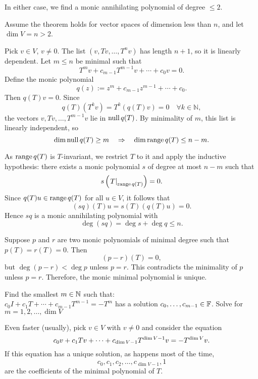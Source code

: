 \begin{prf}
  In either case, we find a monic annihilating polynomial of degree $\leq 2$.

   Assume the theorem holds for vector spaces of dimension less than $n$, and let $\dim V = n > 2$.

  Pick $v \in V$, $v \ne 0$. The list $(v, Tv, \dots, T^n v)$ has length $n+1$, so it is linearly dependent. Let $m \leq n$ be minimal such that
  \[
  T^m v + c_{m-1} T^{m-1}v + \cdots + c_0 v = 0.
  \]
  Define the monic polynomial
  \[
  q(z) := z^m + c_{m-1} z^{m-1} + \cdots + c_0.
  \]
  Then $q(T)v = 0$. Since
  \[
  q(T)(T^k v) = T^k(q(T)v) = 0 \quad \forall k \in \mathbb{N},
  \]
  the vectors $v, Tv, \dots, T^{m-1}v$ lie in $\operatorname{null} q(T)$. By minimality of $m$, this list is linearly independent, so
  \[
  \dim \operatorname{null} q(T) \geq m \quad \Rightarrow \quad \dim \operatorname{range} q(T) \leq n - m.
  \]

  As $\operatorname{range} q(T)$ is $T$-invariant, we restrict $T$ to it and apply the inductive hypothesis: there exists a monic polynomial $s$ of degree at most $n - m$ such that
  \[
  s\left( \left. T \right|_{\operatorname{range} q(T)} \right) = 0.
  \]
  Since $q(T)u \in \operatorname{range} q(T)$ for all $u \in V$, it follows that
  \[
  (sq)(T)u = s(T)(q(T)u) = 0.
  \]
  Hence $sq$ is a monic annihilating polynomial with
  \[
  \deg(sq) = \deg s + \deg q \leq n.
  \]

   Suppose $p$ and $r$ are two monic polynomials of minimal degree such that $p(T) = r(T) = 0$. Then
  \[
  (p - r)(T) = 0,
  \]
  but $\deg(p - r) < \deg p$ unless $p = r$. This contradicts the minimality of $p$ unless $p = r$. Therefore, the monic minimal polynomial is unique.
\end{prf}



\setcounter{thm}{23}

 Find the smallest $m \in \mathbb{N}$ such that: \\
$c_0I + c_1 T + \cdots + c_{m-1} T^{m-1} = -T^{m}$ has a solution $c_0, \dots, c_{m-1} \in \mathbb{F}$. Solve for $m=1,2,\dots,\dim V$

Even faster (usually), pick $v \in V$ with $v \neq 0$ and consider the equation
\begin{equation}
  c_0v + c_1Tv + \cdots + c_{\operatorname{dim} V-1}T^{\operatorname{dim} V-1}v=-T^{\operatorname{dim} V}v.
\end{equation}
If this equation has a unique solution, as happens most of the time,
\begin{equation}
  c_0, c_1, c_2, \dots, c_{\dim V-1}, 1
\end{equation}
are the coefficients of the minimal polynomial of $T$.

